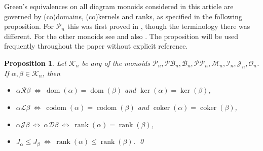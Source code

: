 \documentclass[11pt,a4paper]{article}
\newcommand{\PP}{\mathscr{P}\P}
\newcommand{\M}{\mathcal M}
\renewcommand{\O}{\mathcal O}
\newcommand{\I}{\mathcal I}
\newcommand{\B}{\mathcal B}
\renewcommand{\P}{\mathcal P}
\newcommand{\PB}{\mathcal{PB}}
\renewcommand{\L}{\mathrel{\mathscr L}}
\newcommand{\R}{\mathrel{\mathscr R}}
\newcommand{\D}{\mathrel{\mathscr D}}
\newcommand{\gJ}{\mathrel{\mathscr J}}
\newcommand{\al}{\alpha}
\newcommand{\be}{\beta}
\newcommand{\coker}{\operatorname{coker}}
\newcommand{\dom}{\operatorname{dom}}
\newcommand{\codom}{\operatorname{codom}}
\newcommand{\rank}{\operatorname{rank}}
\newcommand{\1}{\id_n}
\renewcommand{\iff}{\ \Leftrightarrow\ }
\newcommand{\bit}{\begin{itemize}}
\newcommand{\eit}{\end{itemize}}
\newcommand{\itemit}[1]{\item[\emph{(#1)}]}
\newcommand{\epfres}{\hfill\qed}
\numberwithin{equation}{section}
\newtheorem{prop}[equation]{Proposition}
\theoremstyle{definition}
\begin{document}
Green's equivalences on all diagram monoids considered in this article are
governed by (co)domains, (co)kernels and ranks, as specified in the following
proposition.  For $\P_n$ this  was first proved in \cite{Wilcox2007}, though
the terminology there was different.  For the other monoids see \cite[Theorem
2.4]{DEG2017} and also \cite{Fernandes2001,FL2011,GMbook,Wilcox2007}.  The
proposition will be used frequently throughout the paper without explicit
reference.


\begin{prop}\label{prop:green_all_inclusive}
Let $\mathcal{K}_n$ be any of the monoids $\P_n,\PB_n,\B_n,\PP_n,\M_n,\I_n,\mathcal J_n,\O_n$.  If $\al,\be\in\mathcal K_n$, then
  \bit
\itemit{i} $\al\R\be\iff\dom(\al)=\dom(\be)$ and $\ker(\al)=\ker(\be)$,
\itemit{ii} $\al\L\be\iff\codom(\al)=\codom(\be)$ and $\coker(\al)=\coker(\be)$,
\itemit{iii} $\al\gJ\be\iff\al\D\be\iff\rank(\al)=\rank(\be)$,
\itemit{iv} $J_\al\leq J_\be\iff\rank(\al)\leq\rank(\be)$.
\epfres
\eit
\end{prop}
\end{document}
